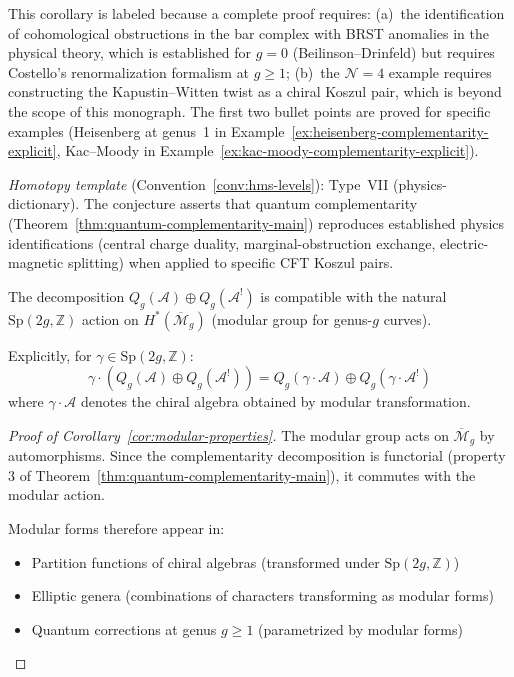 \begin{remark}
This corollary is labeled \ClaimStatusHeuristic{} because a complete proof requires:
(a)~the identification of cohomological obstructions in the bar complex with BRST
anomalies in the physical theory, which is established for $g = 0$
(Beilinson--Drinfeld) but requires Costello's renormalization formalism
\cite{costello-renormalization} at $g \geq 1$;
(b)~the $\mathcal{N}=4$ example requires constructing the Kapustin--Witten twist
as a chiral Koszul pair, which is beyond the scope of this monograph.
The first two bullet points are proved for specific examples (Heisenberg at genus~1
in Example~\ref{ex:heisenberg-complementarity-explicit}, Kac--Moody in
Example~\ref{ex:kac-moody-complementarity-explicit}).

\emph{Homotopy template} (Convention~\ref{conv:hms-levels}): Type~VII (physics-dictionary).
The conjecture asserts that quantum complementarity (Theorem~\ref{thm:quantum-complementarity-main}) reproduces established physics identifications (central charge duality, marginal-obstruction exchange, electric-magnetic splitting) when applied to specific CFT Koszul pairs.
\end{remark}

\begin{corollary}
\label{cor:modular-properties}
The decomposition $Q_g(\mathcal{A}) \oplus Q_g(\mathcal{A}^!)$ is compatible with the
natural $\text{Sp}(2g, \mathbb{Z})$ action on $H^*(\overline{\mathcal{M}}_g)$ (modular
group for genus-$g$ curves).

Explicitly, for $\gamma \in \text{Sp}(2g, \mathbb{Z})$:
\begin{equation}
\gamma \cdot (Q_g(\mathcal{A}) \oplus Q_g(\mathcal{A}^!)) = Q_g(\gamma \cdot \mathcal{A}) 
\oplus Q_g(\gamma \cdot \mathcal{A}^!)
\end{equation}
where $\gamma \cdot \mathcal{A}$ denotes the chiral algebra obtained by modular 
transformation.
\end{corollary}

\begin{proof}[Proof of Corollary~\ref{cor:modular-properties}]
The modular group acts on $\overline{\mathcal{M}}_g$ by automorphisms. Since the 
complementarity decomposition is functorial (property 3 of Theorem~\ref{thm:quantum-complementarity-main}), it commutes with the modular action.

Modular forms therefore appear in:
\begin{itemize}
\item Partition functions of chiral algebras (transformed under $\text{Sp}(2g, 
\mathbb{Z})$)
\item Elliptic genera (combinations of characters transforming as modular forms)
\item Quantum corrections at genus $g \geq 1$ (parametrized by modular forms)
\end{itemize}
\end{proof}


